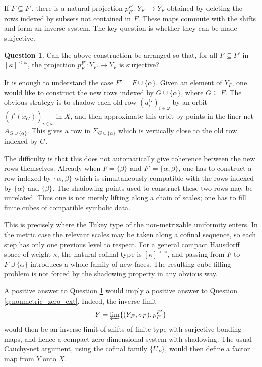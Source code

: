 \documentclass[12pt]{amsart}
\theoremstyle{definition}
\newtheorem{question}[theorem]{Question}
\numberwithin{equation}{section}
\theoremstyle{remark}
\begin{document}
If $F\subseteq F'$, there is a natural projection
$p_F^{F'}:Y_{F'}\to Y_F$ obtained by deleting the rows indexed by subsets not
contained in $F$. These maps commute with the shifts and form an inverse system.
The key question is whether they can be made surjective.

\begin{question}\label{q:surj_cubes}
Can the above construction be arranged so that, for all
$F\subseteq F'$ in $[\kappa]^{<\omega}$, the projection
$p_F^{F'}:Y_{F'}\to Y_F$ is surjective?
\end{question}

It is enough to understand the case $F'=F\cup\{\alpha\}$. Given an element of
$Y_F$, one would like to construct the new rows indexed by
$G\cup\{\alpha\}$, where $G\subseteq F$. The obvious strategy is to shadow each
old row $(a_i^G)_{i\in\omega}$ by an orbit $(f^i(x_G))_{i\in\omega}$ in $X$,
and then approximate this orbit by points in the finer net
$A_{G\cup\{\alpha\}}$. This gives a row in $\Sigma_{G\cup\{\alpha\}}$ which is
vertically close to the old row indexed by $G$.

The difficulty is that this does not automatically give coherence between the
new rows themselves. Already when $F=\{\beta\}$ and
$F'=\{\alpha,\beta\}$, one has to construct a row indexed by
$\{\alpha,\beta\}$ which is simultaneously compatible with the rows indexed by
$\{\alpha\}$ and $\{\beta\}$. The shadowing points used to construct these two
rows may be unrelated. Thus one is not merely lifting along a chain of scales;
one has to fill finite cubes of compatible symbolic data.

This is precisely where the Tukey type of the non-metrizable uniformity enters.
In the metric case the relevant scales may be taken along a cofinal sequence,
so each step has only one previous level to respect. For a general compact
Hausdorff space of weight $\kappa$, the natural cofinal type is
$[\kappa]^{<\omega}$, and passing from $F$ to $F\cup\{\alpha\}$ introduces a
whole family of new faces. The resulting cube-filling problem is not forced by
the shadowing property in any obvious way.

A positive answer to Question \ref{q:surj_cubes} would imply a positive answer
to Question \ref{q:nonmetric_zero_ext}. Indeed, the inverse limit
\[
    Y=\varprojlim\{(Y_F,\sigma_F),p_F^{F'}\}
\]
would then be an inverse limit of shifts of finite type with surjective bonding
maps, and hence a compact zero-dimensional system with shadowing. The usual
Cauchy-net argument, using the cofinal family $\{U_F\}$, would then define a
factor map from $Y$ onto $X$.
\end{document}
